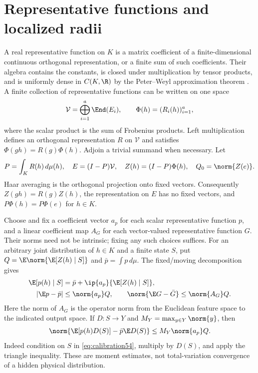 \section{Representative functions and localized radii}\label{sec:local54}
A real representative function on $K$ is a matrix coefficient of a finite-dimensional continuous orthogonal representation, or a finite sum of such coefficients. Their algebra contains the constants, is closed under multiplication by tensor products, and is uniformly dense in $C(K,\R)$ by the Peter--Weyl approximation theorem \cite{Folland}. A finite collection of representative functions can be written on one space
\[
 \mathcal V=\bigoplus_{i=1}^a\End(E_i),\qquad
 \Phi(h)=(R_i(h))_{i=1}^a,
\]
where the scalar product is the sum of Frobenius products. Left multiplication defines an orthogonal representation $R$ on $\mathcal V$ and satisfies $\Phi(gh)=R(g)\Phi(h)$. Adjoin a trivial summand when necessary. Let
\[
 P=\int_KR(h)\,d\mu(h),\quad E=(I-P)\mathcal V,\quad
 Z(h)=(I-P)\Phi(h),\quad Q_0=\norm{Z(e)}.
\]
Haar averaging is the orthogonal projection onto fixed vectors. Consequently $Z(gh)=R(g)Z(h)$, the representation on $E$ has no fixed vectors, and $P\Phi(h)=P\Phi(e)$ for $h\in K$.

Choose and fix a coefficient vector $a_p$ for each scalar representative function $p$, and a linear coefficient map $A_G$ for each vector-valued representative function $G$. Their norms need not be intrinsic; fixing any such choices suffices. For an arbitrary joint distribution of $h\in K$ and a finite state $S$, put $Q=\E\norm{\E[Z(h)\mid S]}$ and $\bar p=\int p\,d\mu$. The fixed/moving decomposition gives
\begin{align}
 \E[p(h)\mid S]&=\bar p+\ip{a_p}{\E[Z(h)\mid S]},\label{eq:calibration54}\\
 |\E p-\bar p|&\le\norm{a_p}Q,\qquad
 \norm{\E G-\bar G}\le\norm{A_G}Q.\label{eq:vectorcal54}
\end{align}
Here the norm of $A_G$ is the operator norm from the Euclidean feature space to the indicated output space. If $D:S\to Y$ and $M_Y=\max_{y\in Y}\norm{y}$, then
\begin{equation}\label{eq:decodercal54}
 \norm{\E[p(h)D(S)]-\bar p\E D(S)}\le M_Y\norm{a_p}Q.
\end{equation}
Indeed condition on $S$ in \eqref{eq:calibration54}, multiply by $D(S)$, and apply the triangle inequality. These are moment estimates, not total-variation convergence of a hidden physical distribution.

